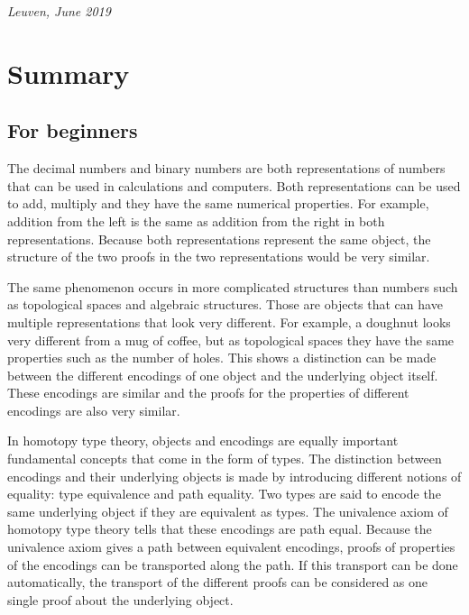 \documentclass[12pt,a4paper,twoside,xetex]{book} %
\begin{document}
\mbox{}\hfill \textit{Leuven, June 2019}

\chapter*{Summary}

\section*{For beginners}

The decimal numbers and binary numbers are both representations of numbers that can be used in calculations and computers. Both representations can be used to add, multiply and they have the same numerical properties. For example, addition from the left is the same as addition from the right in both representations. Because both representations  represent the same object, the structure of the two proofs in the two representations would be very similar.  

The same phenomenon occurs in more complicated structures than numbers such as topological spaces and algebraic structures. Those are objects that can have multiple representations that look very different. For example, a doughnut looks very different from a mug of coffee, but as topological spaces they have the same properties such as the number of holes. This shows a distinction can be made between the different encodings of one object and the underlying object itself. These encodings are similar and the proofs for the properties of different encodings are also very similar.

In homotopy type theory, objects and encodings are equally important fundamental concepts that come in the form of types. The distinction between encodings and their underlying objects is made by introducing  different notions of equality: type equivalence and path equality. Two types are said to encode the same underlying object if they are equivalent as types. The univalence axiom of homotopy type theory tells that these encodings are path equal. Because the univalence axiom gives a path between equivalent encodings, proofs of properties of the encodings can be transported along the path. If this transport can be done automatically, the transport of the different proofs can be considered as one single proof about the underlying object. 
\end{document}
